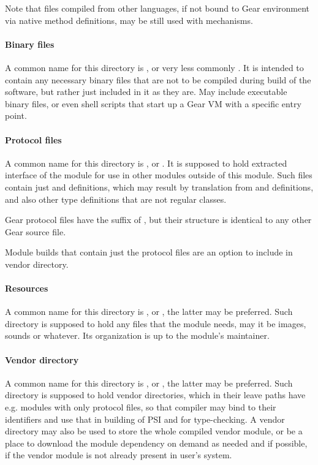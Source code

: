 Note that files compiled from other languages, if not bound to Gear environment via native method definitions, may be still used with  mechanisms. 

\paragraph{Binary files}
A common name for this directory is , or very less commonly . It is intended to contain any necessary binary files that are not to be compiled during build of the software, but rather just included in it as they are. May include executable binary files, or even shell scripts that start up a Gear VM with a specific entry point. 

\paragraph{Protocol files}
A common name for this directory is , or . It is supposed to hold extracted interface of the module for use in other modules outside of this module. Such files contain just  and  definitions, which may result by translation from  and  definitions, and also other type definitions that are not regular classes. 

Gear protocol files have the suffix of , but their structure is identical to any other Gear source file. 

Module builds that contain just the protocol files are an option to include in vendor directory. 

\paragraph{Resources}
A common name for this directory is , or , the latter may be preferred. Such directory is supposed to hold any files that the module needs, may it be images, sounds or whatever. Its organization is up to the module's maintainer. 

\paragraph{Vendor directory}
A common name for this directory is , or , the latter may be preferred. Such directory is supposed to hold vendor directories, which in their leave paths have e.g. modules with only protocol files, so that compiler may bind to their identifiers and use that in building of PSI and for type-checking. A vendor directory may also be used to store the whole compiled vendor module, or be a place to download the module dependency on demand as needed and if possible, if the vendor module is not already present in user's system. 

